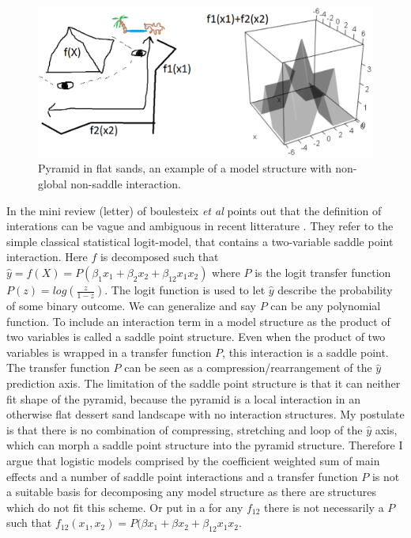 \begin{figure}
\includegraphics{graphics/sketch_pyramid_interaction.png}
\caption{Pyramid in flat sands, an example of a model structure with non-global non-saddle interaction.}
\label{pyramid}
\end{figure}

In the mini review (letter) of boulesteix \textit{et al} points out that the definition of interations can be vague and ambiguous in recent litterature \cite{boulesteix2014letter}. They refer to the simple classical statistical logit-model, that contains a two-variable saddle point interaction. Here $f$ is decomposed such that $\hat{y} = f(X) = P(\beta_1 x_1 + \beta_2 x_2 + \beta_{12} x_1 x_2)$ where $P$ is the logit transfer function $P(z) = log(\frac{z}{1-z})$. The logit function is used to let $\hat{y}$ describe the probability of some binary outcome. We can generalize and say $P$ can be any polynomial function. To include an interaction term in a model structure as the product of two variables is called a saddle point structure. Even when the product of two variables is wrapped in a transfer function $P$, this interaction is a saddle point. The transfer function $P$ can be seen as a compression/rearrangement of the $\hat{y}$ prediction axis. The limitation of the saddle point structure is that it can neither fit shape of the pyramid, because the pyramid is a local interaction in an otherwise flat dessert sand landscape with no interaction structures. My postulate is that there is no combination of compressing, stretching and loop of the $\hat{y}$ axis, which can morph a saddle point structure into the pyramid structure. Therefore I argue that logistic models comprised by the coefficient weighted sum of main effects and a number of saddle point interactions and a transfer function $P$ is not a suitable basis for decomposing any model structure as there are structures which do not fit this scheme. Or put in a for any $f_12$ there is not necessarily a $P$ such that $f_{12}(x_1,x_2) = P(\beta x_1+ \beta x_2 + \beta_{12} x_1 x_2$. 

